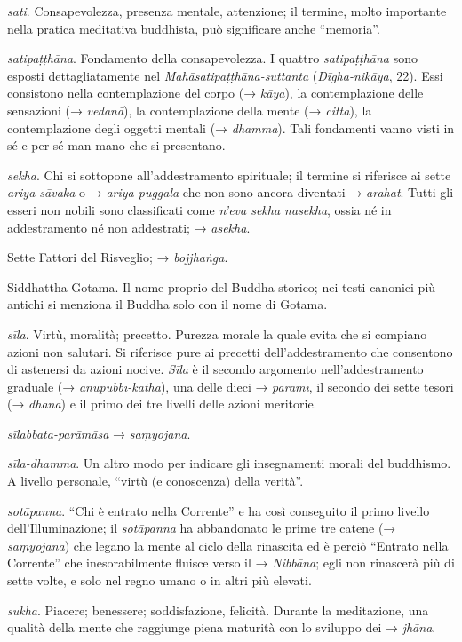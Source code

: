 \emph{sati}. Consapevolezza, presenza mentale, attenzione; il termine,
molto importante nella pratica meditativa buddhista, può significare
anche ``memoria''.

\emph{satipaṭṭhāna}. Fondamento della consapevolezza. I quattro
\emph{satipaṭṭhāna} sono esposti dettagliatamente nel
\emph{Mahāsatipaṭṭhāna-suttanta} (\emph{Dīgha-nikāya}, 22). Essi
consistono nella contemplazione del corpo (→ \emph{kāya}), la
contemplazione delle sensazioni (→ \emph{vedanā}), la contemplazione
della mente (→ \emph{citta}), la contemplazione degli oggetti mentali (→
\emph{dhamma}). Tali fondamenti vanno visti in sé e per sé man mano che
si presentano.

\emph{sekha}. Chi si sottopone all'addestramento spirituale; il termine
si riferisce ai sette \emph{ariya-sāvaka} o → \emph{ariya-puggala} che
non sono ancora diventati → \emph{arahat}. Tutti gli esseri non nobili
sono classificati come \emph{n'eva sekha nasekha}, ossia né in
addestramento né non addestrati; → \emph{asekha}.

Sette Fattori del Risveglio; → \emph{bojjhaṅga}.

Siddhattha Gotama. Il nome proprio del Buddha storico; nei testi
canonici più antichi si menziona il Buddha solo con il nome di Gotama.

\emph{sīla}. Virtù, moralità; precetto. Purezza morale la quale evita
che si compiano azioni non salutari. Si riferisce pure ai precetti
dell'addestramento che consentono di astenersi da azioni nocive.
\emph{Sīla} è il secondo argomento nell'addestramento graduale (→
\emph{anupubbī-kathā}), una delle dieci → \emph{pāramī}, il secondo dei
sette tesori (→ \emph{dhana}) e il primo dei tre livelli delle azioni
meritorie.

\emph{sīlabbata-parāmāsa} → \emph{saṃyojana}.

\emph{sīla-dhamma}. Un altro modo per indicare gli insegnamenti morali
del buddhismo. A livello personale, ``virtù (e conoscenza) della
verità''.

\emph{sotāpanna}. ``Chi è entrato nella Corrente'' e ha così conseguito
il primo livello dell'Illuminazione; il \emph{sotāpanna} ha abbandonato
le prime tre catene (→ \emph{saṃyojana}) che legano la mente al ciclo
della rinascita ed è perciò ``Entrato nella Corrente'' che
inesorabilmente fluisce verso il → \emph{Nibbāna}; egli non rinascerà
più di sette volte, e solo nel regno umano o in altri più elevati.

\emph{sukha}. Piacere; benessere; soddisfazione, felicità. Durante la
meditazione, una qualità della mente che raggiunge piena maturità con lo
sviluppo dei → \emph{jhāna}.


